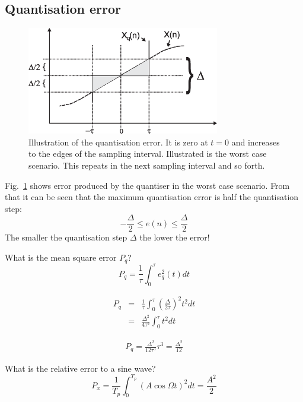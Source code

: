 \documentclass[12pt,a4paper]{article}
\begin{document}
\subsection{Quantisation error}
\begin{figure}[!hbt]
\begin{center}
\mbox{\includegraphics[width=0.75\textwidth]{quant_err}}
\end{center}
\caption{Illustration of the quantisation error. It is zero at $t=0$
and increases to the edges of the sampling interval. Illustrated
is the worst case scenario. This repeats in the next sampling interval
and so forth.
\label{quant_err}}
\end{figure}

Fig.~\ref{quant_err} shows error produced by the quantiser in the
worst case scenario. From that it can be seen that the maximum quantisation
error is half the quantisation step:
\begin{equation}
- \frac{\Delta}{2} \le e(n) \le \frac{\Delta}{2}
\end{equation}
The smaller the quantisation step $\Delta$ the lower the error!

What is the mean square error $P_{q}$?
\begin{equation}
P_{q} = \frac {1}{\tau} \int_{0}^{\tau} e_{q}^{2}(t)  dt
\end{equation}

\begin{eqnarray}
P_{q} & = & \frac{1}{\tau} \int_0^\tau \left(\frac{\Delta}{2\tau}\right)^2 t^2 dt \\
      & = & \frac{\Delta^2}{4 \tau^3} \int_0^\tau t^2 dt
\end{eqnarray}

\begin{eqnarray}
P_{q} = \frac{\Delta^2}{12\tau^3} \tau^3 =\frac{\Delta^2}{12}
\end{eqnarray}


What is the relative error to a sine wave?
\begin{equation}
P_x = \frac{1}{T_p} \int_{0}^{T_p}(A \cos \Omega t)^2 dt = \frac{A^2}{2}
\end{equation}
\end{document}
